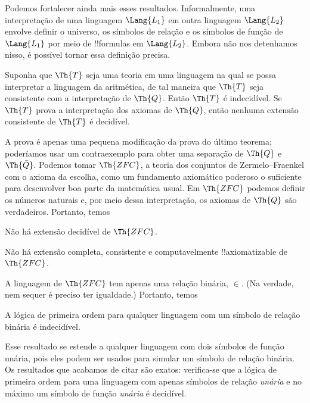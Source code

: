 \documentclass[../../../include/open-logic-section]{subfiles}
\begin{document}


Podemos fortalecer ainda mais esses resultados. Informalmente, uma
interpretação de uma linguagem $\Lang{L_1}$ em outra linguagem
$\Lang{L_2}$ envolve definir o universo, os símbolos de relação e os
símbolos de função de $\Lang{L_1}$ por meio de !!{formula}s em
$\Lang{L_2}$. Embora não nos detenhamos nisso, é possível tornar essa
definição precisa.

\begin{thm}
  Suponha que $\Th{T}$ seja uma teoria em uma linguagem na qual se possa
  interpretar a linguagem da aritmética, de tal maneira que $\Th{T}$ seja
  consistente com a interpretação de $\Th{Q}$. Então $\Th{T}$ é
  indecidível. Se $\Th{T}$ prova a interpretação dos axiomas de
  $\Th{Q}$, então nenhuma extensão consistente de $\Th{T}$ é decidível.
\end{thm}

A prova é apenas uma pequena modificação da prova do último teorema;
poderíamos usar um contraexemplo para obter uma separação de $\Th{Q}$ e
$\Th{\bar Q}$. Podemos tomar $\Th{ZFC}$, a teoria dos conjuntos de
Zermelo--Fraenkel com o axioma da escolha, como um fundamento axiomático
poderoso o suficiente para desenvolver boa parte da matemática usual. Em
$\Th{ZFC}$ podemos definir os números naturais e, por meio dessa
interpretação, os axiomas de $\Th{Q}$ são verdadeiros. Portanto, temos

\begin{cor}
Não há extensão decidível de $\Th{ZFC}$.
\end{cor}

\begin{cor}
Não há extensão completa, consistente e computavelmente !!{axiomatizable} de
$\Th{ZFC}$.
\end{cor}

A linguagem de $\Th{ZFC}$ tem apenas uma relação binária,
$\in$. (Na verdade, nem sequer é preciso ter igualdade.) Portanto, temos

\begin{cor}
A lógica de primeira ordem para qualquer linguagem com um símbolo de relação
binária é indecidível.
\end{cor}

Esse resultado se estende a qualquer linguagem com dois símbolos de função
unária, pois eles podem ser usados para simular um símbolo de relação binária.
Os resultados que acabamos de citar são exatos: verifica-se que a lógica de
primeira ordem para uma linguagem com apenas símbolos de relação
\emph{unária} e no máximo um símbolo de função \emph{unária} é decidível.
\end{document}
